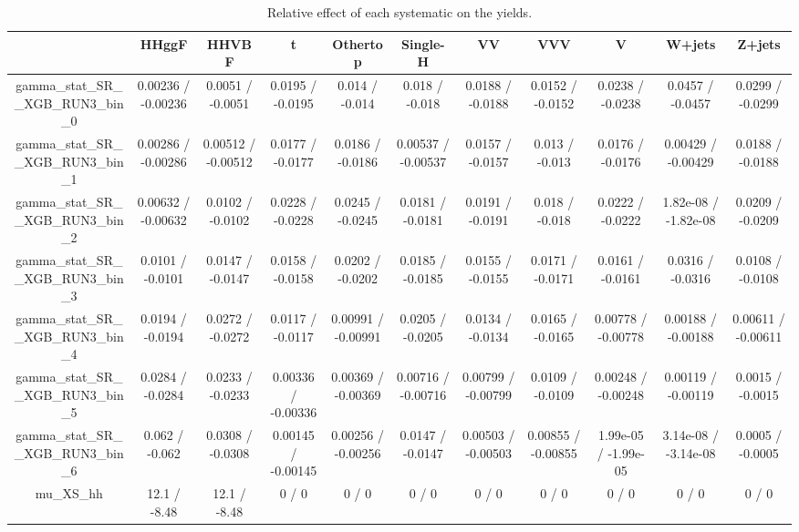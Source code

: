 \documentclass[10pt]{article}
\begin{document}
\begin{table}[htbp]
\begin{center}
\begin{tabular}{|c|c|c|c|c|c|c|c|c|c|c|}
\hline 
      & HHggF      & HHVBF      & t      & Othertop      & Single-H      & VV      & VVV      & V      & W+jets      & Z+jets \\ 
\hline 
  gamma_stat_SR__XGB_RUN3_bin_0 & 0.00236 / -0.00236 & 0.0051 / -0.0051 & 0.0195 / -0.0195 & 0.014 / -0.014 & 0.018 / -0.018 & 0.0188 / -0.0188 & 0.0152 / -0.0152 & 0.0238 / -0.0238 & 0.0457 / -0.0457 & 0.0299 / -0.0299 \\ 
  gamma_stat_SR__XGB_RUN3_bin_1 & 0.00286 / -0.00286 & 0.00512 / -0.00512 & 0.0177 / -0.0177 & 0.0186 / -0.0186 & 0.00537 / -0.00537 & 0.0157 / -0.0157 & 0.013 / -0.013 & 0.0176 / -0.0176 & 0.00429 / -0.00429 & 0.0188 / -0.0188 \\ 
  gamma_stat_SR__XGB_RUN3_bin_2 & 0.00632 / -0.00632 & 0.0102 / -0.0102 & 0.0228 / -0.0228 & 0.0245 / -0.0245 & 0.0181 / -0.0181 & 0.0191 / -0.0191 & 0.018 / -0.018 & 0.0222 / -0.0222 & 1.82e-08 / -1.82e-08 & 0.0209 / -0.0209 \\ 
  gamma_stat_SR__XGB_RUN3_bin_3 & 0.0101 / -0.0101 & 0.0147 / -0.0147 & 0.0158 / -0.0158 & 0.0202 / -0.0202 & 0.0185 / -0.0185 & 0.0155 / -0.0155 & 0.0171 / -0.0171 & 0.0161 / -0.0161 & 0.0316 / -0.0316 & 0.0108 / -0.0108 \\ 
  gamma_stat_SR__XGB_RUN3_bin_4 & 0.0194 / -0.0194 & 0.0272 / -0.0272 & 0.0117 / -0.0117 & 0.00991 / -0.00991 & 0.0205 / -0.0205 & 0.0134 / -0.0134 & 0.0165 / -0.0165 & 0.00778 / -0.00778 & 0.00188 / -0.00188 & 0.00611 / -0.00611 \\ 
  gamma_stat_SR__XGB_RUN3_bin_5 & 0.0284 / -0.0284 & 0.0233 / -0.0233 & 0.00336 / -0.00336 & 0.00369 / -0.00369 & 0.00716 / -0.00716 & 0.00799 / -0.00799 & 0.0109 / -0.0109 & 0.00248 / -0.00248 & 0.00119 / -0.00119 & 0.0015 / -0.0015 \\ 
  gamma_stat_SR__XGB_RUN3_bin_6 & 0.062 / -0.062 & 0.0308 / -0.0308 & 0.00145 / -0.00145 & 0.00256 / -0.00256 & 0.0147 / -0.0147 & 0.00503 / -0.00503 & 0.00855 / -0.00855 & 1.99e-05 / -1.99e-05 & 3.14e-08 / -3.14e-08 & 0.0005 / -0.0005 \\ 
  mu_XS_hh & 12.1 / -8.48 & 12.1 / -8.48 & 0 / 0 & 0 / 0 & 0 / 0 & 0 / 0 & 0 / 0 & 0 / 0 & 0 / 0 & 0 / 0 \\ 
\hline 
\end{tabular} 
\caption{Relative effect of each systematic on the yields.} 
\end{center} 
\end{table} 
\end{document}
